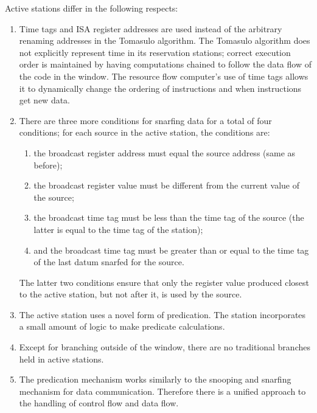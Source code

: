 \documentclass[10pt,dvips]{article}
\begin{document}
Active stations differ in the following respects:
\begin{enumerate}
\item Time tags and ISA register addresses
are used instead of the arbitrary renaming addresses in the Tomasulo algorithm.
The Tomasulo
algorithm does not explicitly represent time in its reservation stations;
correct execution order is maintained by having computations chained to
follow the data flow of the code in the window. The resource flow computer's
use of time tags allows it to dynamically change the ordering of instructions
and when instructions get new data.

\item There are three more conditions for snarfing data for a total of four
conditions; for each source in the active station, the conditions are:
\begin{enumerate}
\item the broadcast register address must equal the source address (same
as before);

\item the broadcast register value must be different from the current
value of the source;

\item the broadcast time tag must be less than the time tag of the source (the
latter is equal to the time tag of the station);

\item and the broadcast time tag must be greater than or equal to the time tag of
the last datum snarfed for the source.
\end{enumerate}

The latter two conditions ensure that only the register value produced
closest to the active station, but not after it, is used by the source.

\item The active station uses a novel form of predication. The station
incorporates a small amount of logic to make predicate calculations.

\item Except for branching outside of the window, there are no traditional
branches held in active stations.

\item The predication mechanism works similarly to the snooping and snarfing
mechanism for data communication. Therefore there is a unified approach to
the handling of control flow and data flow.
\end{enumerate}
\end{document}
